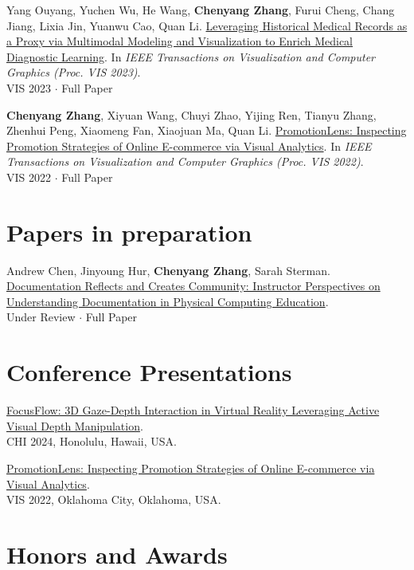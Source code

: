 \documentclass[margin,line]{res}
\newcommand{\SectionTitle}[1]{
\vspace{-.1cm}
\section{#1}
\vspace{.2cm}
}
\newcommand{\PubItem}[5]{
  \vspace{-.2cm}
  #2. \href{#3}{\textcolor{themecolor}{#1}}. In \textit{#4}. \\ {#5}
}
\newcommand{\PaperItem}[4]{
  \vspace{-.2cm}
  #2. \href{#3}{\textcolor{themecolor}{#1}}. \\ {#4}
}
\newcommand{\PreItem}[3]{
  \vspace{-.2cm}
  \href{#2}{\textcolor{themecolor}{#1}}. \\ {#3}
}
\begin{document}
\begin{resume}
\PubItem{Leveraging Historical Medical Records as a Proxy via Multimodal Modeling and Visualization to Enrich Medical Diagnostic Learning}
{Yang Ouyang, Yuchen Wu, He Wang, \textbf{Chenyang Zhang}, Furui Cheng, Chang Jiang, Lixia Jin, Yuanwu Cao, Quan Li}
{https://arxiv.org/abs/2307.12199}
{IEEE Transactions on Visualization and Computer Graphics (Proc. VIS 2023)}
{VIS 2023 $\cdot$ Full Paper}

\PubItem{PromotionLens: Inspecting Promotion Strategies of Online E-commerce via Visual Analytics}
{\textbf{Chenyang Zhang}, Xiyuan Wang, Chuyi Zhao, Yijing Ren, Tianyu Zhang, Zhenhui Peng, Xiaomeng Fan, Xiaojuan Ma, Quan Li}
{https://ieeexplore.ieee.org/document/9903289}
{IEEE Transactions on Visualization and Computer Graphics (Proc. VIS 2022)}
{VIS 2022 $\cdot$ Full Paper}



\SectionTitle{Papers in preparation}


\PaperItem{Documentation Reflects and Creates Community: Instructor Perspectives on Understanding Documentation in Physical Computing Education}
{Andrew Chen, Jinyoung Hur, \textbf{Chenyang Zhang}, Sarah Sterman}
{https://www.chenyang.me/work/physcom-documentation}
{Under Review $\cdot$ Full Paper}


\SectionTitle{Conference Presentations}

\PreItem{FocusFlow: 3D Gaze-Depth Interaction in Virtual Reality Leveraging Active Visual Depth Manipulation}{https://programs.sigchi.org/chi/2024/program/content/146886}{CHI 2024, Honolulu, Hawaii, USA.}

\PreItem{PromotionLens: Inspecting Promotion Strategies of Online E-commerce via Visual Analytics}{https://youtu.be/6AJ0C3FZKyY?t=791}{VIS 2022, Oklahoma City, Oklahoma, USA.}


\SectionTitle{Honors and Awards}
\vspace{-.2cm}


\end{resume}
\end{document}
